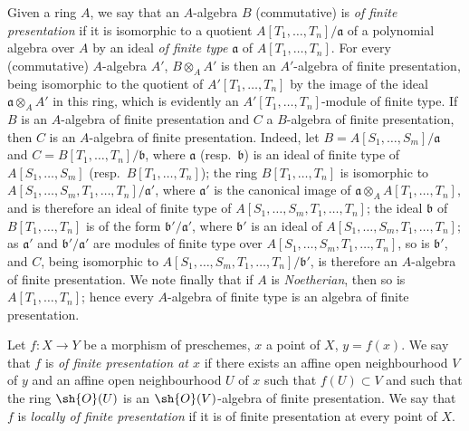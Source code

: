 \begin{env}[1.4.1]
\label{IV.1.4.1}
Given a ring $A$, we say that an $A$-algebra $B$ (commutative) is \emph{of finite presentation} if it is isomorphic to a quotient $A[T_1,\ldots,T_n]/\mathfrak{a}$ of a polynomial algebra over $A$ by an ideal \emph{of finite type} $\mathfrak{a}$ of $A[T_1,\ldots,T_n]$.
For every (commutative) $A$-algebra $A'$, $B\otimes_A A'$ is then an $A'$-algebra of finite presentation, being isomorphic to the quotient of $A'[T_1,\ldots,T_n]$ by the image of the ideal $\mathfrak{a}\otimes_A A'$ in this ring, which is evidently an $A'[T_1,\ldots,T_n]$-module of finite type.
If $B$ is an $A$-algebra of finite presentation and $C$ a $B$-algebra of finite presentation, then $C$ is an $A$-algebra of finite presentation.
Indeed, let $B = A[S_1,\ldots,S_m]/\mathfrak{a}$ and $C = B[T_1,\ldots,T_n]/\mathfrak{b}$, where $\mathfrak{a}$ (resp.~$\mathfrak{b}$) is an ideal of finite type of $A[S_1,\ldots,S_m]$ (resp.~$B[T_1,\ldots,T_n]$); the ring $B[T_1,\ldots,T_n]$ is isomorphic to $A[S_1,\ldots,S_m,T_1,\ldots,T_n]/\mathfrak{a}'$, where $\mathfrak{a}'$ is the canonical image of $\mathfrak{a}\otimes_A A[T_1,\ldots,T_n]$, and is therefore an ideal of finite type of $A[S_1,\ldots,S_m,T_1,\ldots,T_n]$; the ideal $\mathfrak{b}$ of $B[T_1,\ldots,T_n]$ is of the form $\mathfrak{b}'/\mathfrak{a}'$, where $\mathfrak{b}'$ is an ideal of $A[S_1,\ldots,S_m,T_1,\ldots,T_n]$; as $\mathfrak{a}'$ and $\mathfrak{b}'/\mathfrak{a}'$ are modules of finite type over $A[S_1,\ldots,S_m,T_1,\ldots,T_n]$, so is $\mathfrak{b}'$, and $C$, being isomorphic to $A[S_1,\ldots,S_m,T_1,\ldots,T_n]/\mathfrak{b}'$, is therefore an $A$-algebra of finite presentation.
We note finally that if $A$ is \emph{Noetherian}, then so is $A[T_1,\ldots,T_n]$; hence every $A$-algebra of finite type is an algebra of finite presentation.
\end{env}

\begin{definition}[1.4.2]
\label{IV.1.4.2}
Let $f:X\to Y$ be a morphism of preschemes, $x$ a point of $X$, $y=f(x)$.
We say that $f$ is \emph{of finite presentation at $x$} if there exists an affine open neighbourhood $V$ of $y$ and an affine open neighbourhood $U$ of $x$ such that $f(U)\subset V$ and such that the ring $\sh{O}(U)$ is an $\sh{O}(V)$-algebra of finite presentation.
We say that $f$ is \emph{locally of finite presentation} if it is of finite presentation at every point of $X$.
\end{definition}

